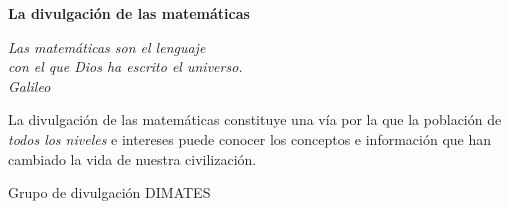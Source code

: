 \documentclass{article}
\begin{document}
{\Large
\begin{center}
  \textbf{La divulgación de las matemáticas}
\end{center}}

\begin{flushright}
\textit{Las matemáticas son el lenguaje \\
con el que Dios ha escrito el universo.\\
Galileo}
\end{flushright}

La divulgación de las matemáticas constituye una vía por la que la población
de {\small \textit{todos los niveles}} e intereses puede conocer los
conceptos e información que han cambiado la vida de nuestra civilización.

\begin{flushright}
    {\footnotesize Grupo de divulgación DIMATES}
\end{flushright}
\end{document}
